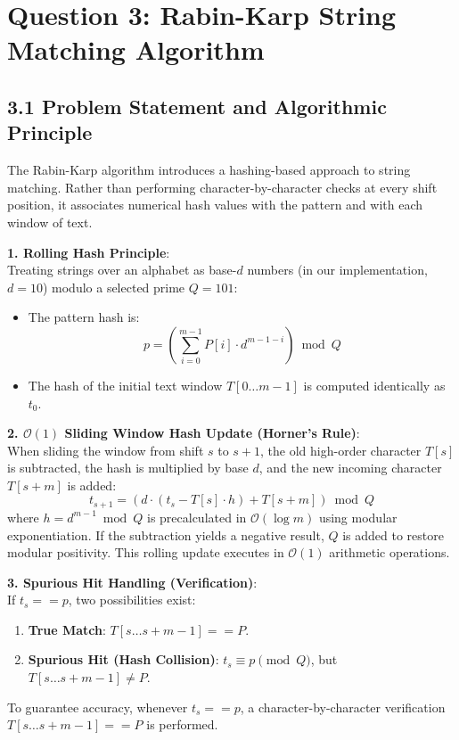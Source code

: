 \documentclass[12pt]{article}
\begin{document}
\vspace{0.4cm}

\section*{Question 3: Rabin-Karp String Matching Algorithm}

\subsection*{3.1 Problem Statement and Algorithmic Principle}
The Rabin-Karp algorithm introduces a hashing-based approach to string matching. Rather than performing character-by-character checks at every shift position, it associates numerical hash values with the pattern and with each window of text.

\textbf{1. Rolling Hash Principle}:\\
Treating strings over an alphabet as base-$d$ numbers (in our implementation, $d = 10$) modulo a selected prime $Q = 101$:
\begin{itemize}
    \item The pattern hash is:
    \[
    p = \left( \sum_{i=0}^{m-1} P[i] \cdot d^{m-1-i} \right) \bmod Q
    \]
    \item The hash of the initial text window $T[0 \dots m-1]$ is computed identically as $t_0$.
\end{itemize}

\textbf{2. $\mathcal{O}(1)$ Sliding Window Hash Update (Horner's Rule)}:\\
When sliding the window from shift $s$ to $s+1$, the old high-order character $T[s]$ is subtracted, the hash is multiplied by base $d$, and the new incoming character $T[s+m]$ is added:
\[
t_{s+1} = \left( d \cdot (t_s - T[s] \cdot h) + T[s+m] \right) \bmod Q
\]
where $h = d^{m-1} \bmod Q$ is precalculated in $\mathcal{O}(\log m)$ using modular exponentiation. If the subtraction yields a negative result, $Q$ is added to restore modular positivity. This rolling update executes in $\mathcal{O}(1)$ arithmetic operations.

\textbf{3. Spurious Hit Handling (Verification)}:\\
If $t_s == p$, two possibilities exist:
\begin{enumerate}
    \item \textbf{True Match}: $T[s \dots s+m-1] == P$.
    \item \textbf{Spurious Hit (Hash Collision)}: $t_s \equiv p \pmod Q$, but $T[s \dots s+m-1] \ne P$.
\end{enumerate}
To guarantee accuracy, whenever $t_s == p$, a character-by-character verification $T[s \dots s+m-1] == P$ is performed.
\end{document}
